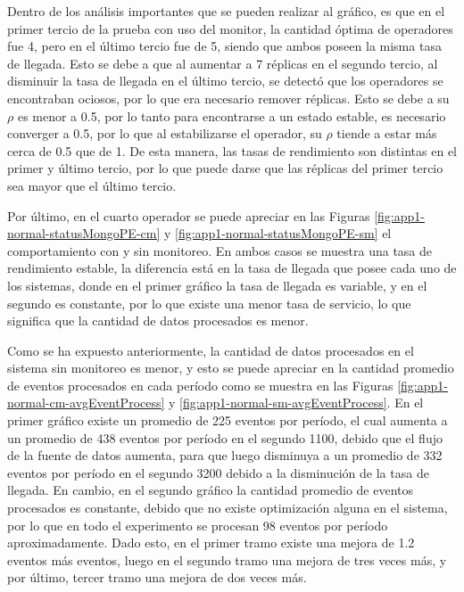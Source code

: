 Dentro de los análisis importantes que se pueden realizar al gráfico, es que en el primer tercio de la prueba con uso del monitor, la cantidad óptima de operadores fue 4, pero en el último tercio fue de 5, siendo que ambos poseen la misma tasa de llegada. Esto se debe a que al aumentar a 7 réplicas en el segundo tercio, al disminuir la tasa de llegada en el último tercio, se detectó que los operadores se encontraban ociosos, por lo que era necesario remover réplicas. Esto se debe a su $\rho$ es menor a 0.5, por lo tanto para encontrarse a un estado estable, es necesario converger a 0.5, por lo que al estabilizarse el operador, su $\rho$ tiende a estar más cerca de 0.5 que de 1. De esta manera, las tasas de rendimiento son distintas en el primer y último tercio, por lo que puede darse que las réplicas del primer tercio sea mayor que el último tercio.

Por último, en el cuarto operador se puede apreciar en las Figuras \ref{fig:app1-normal-statusMongoPE-cm} y \ref{fig:app1-normal-statusMongoPE-sm} el comportamiento con y sin monitoreo. En ambos casos se muestra una tasa de rendimiento estable, la diferencia está en la tasa de llegada que posee cada uno de los sistemas, donde en el primer gráfico la tasa de llegada es variable, y en el segundo es constante, por lo que existe una menor tasa de servicio, lo que significa que la cantidad de datos procesados es menor.

Como se ha expuesto anteriormente, la cantidad de datos procesados en el sistema sin monitoreo es menor, y esto se puede apreciar en la cantidad promedio de eventos procesados en cada período como se muestra en las Figuras \ref{fig:app1-normal-cm-avgEventProcess} y \ref{fig:app1-normal-sm-avgEventProcess}. En el primer gráfico existe un promedio de 225 eventos por período, el cual aumenta a un promedio de 438 eventos por período en el segundo 1100, debido que el flujo de la fuente de datos aumenta, para que luego disminuya a un promedio de 332 eventos por período en el segundo 3200 debido a la disminución de la tasa de llegada. En cambio, en el segundo gráfico la cantidad promedio de eventos procesados es constante, debido que no existe optimización alguna en el sistema, por lo que en todo el experimento se procesan 98 eventos por período aproximadamente. Dado esto, en el primer tramo existe una mejora de 1.2 eventos más eventos, luego en el segundo tramo una mejora de tres veces más, y por último, tercer tramo una mejora de dos veces más.

